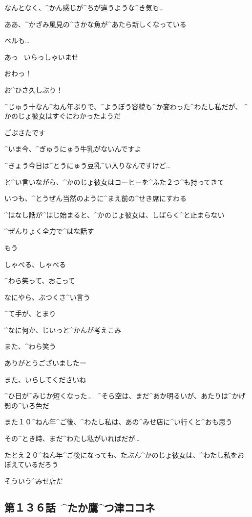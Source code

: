 \N なんとなく、^{かん}{感}じが^{ちが}{違}うような^{き}{気}も…

\page
\N ああ、^{かざみ}{風見}の^{さかな}{魚}が^{あたら}{新}しくなっている

\N ベルも…

\page
\A あっ
\ いらっしゃいませ

\A おわっ！

\A お^{ひさ}{久}しぶり！

\N ^{じゅう}{十}なん^{ねん}{年}ぶりで、^{ようぼう}{容貌}も^{か}{変}わった^{わたし}{私}だが、
^{かのじょ}{彼女}はすぐにわかったようだ

\A ごぶさたです

\page
\A ^{いま}{今}、^{ぎゅうにゅう}{牛乳}がないんですよ

\A ^{きょう}{今日}は^{とうにゅう}{豆乳}^{い}{入}りなんですけど…

\N と^{い}{言}いながら、^{かのじょ}{彼女}はコーヒーを^{ふた}{２}つ^{も}{持}ってきて

\N いつも、^{とうぜん}{当然}のように^{まえ}{前}の^{せき}{席}にすわる

\page[65]
\N ^{はなし}{話}が^{はじ}{始}まると、^{かのじょ}{彼女}は、しばらく^{と}{止}まらない

\N ^{ぜんりょく}{全力}で^{はな}{話}す

\N もう

\N しゃべる、しゃべる

\page
\N ^{わら}{笑}って、おこって

\N なにやら、ぶつくさ^{い}{言}う

\page
\N ^{て}{手}が、とまり

\page
\N ^{なに}{何}か、じいっと^{かんが}{考}えこみ

\page
\N また、^{わら}{笑}う

\page
\A ありがとうございましたー

\A また、いらしてくださいね

\page
\N ^{ひ}{日}が^{みじか}{短}くなった…
\ ^{そら}{空}は、まだ^{あか}{明}るいが、あたりは^{かげ}{影}の^{いろ}{色}だ

\N また１０^{ねん}{年}^{ご}{後}、^{わたし}{私}は、あの^{みせ}{店}に^{い}{行}くと^{おも}{思}う

\N その^{とき}{時}、まだ^{わたし}{私}がいればだが…

\N たとえ２０^{ねん}{年}^{ご}{後}になっても、たぶん^{かのじょ}{彼女}は、^{わたし}{私}をおぼえているだろう

\page
\N そういう^{みせ}{店}だ


\subsection{第１３６話\ ^{たか}{鷹}^{つ}{津}ココネ}

